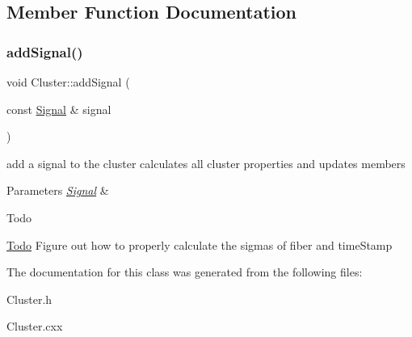 \subsection{Member Function Documentation}
\mbox{\label{classCluster_aa12f4e548b102a48621ca7ec91bc2330}} 
\subsubsection{\texorpdfstring{add\+Signal()}{addSignal()}}
{\footnotesize\ttfamily void Cluster\+::add\+Signal (\begin{DoxyParamCaption}\item[{const \hyperlink{classSignal}{Signal} \&}]{signal }\end{DoxyParamCaption})\hspace{0.3cm}{\ttfamily [inline]}}

add a signal to the cluster calculates all cluster properties and updates members 
\begin{DoxyParams}{Parameters}
{\em \hyperlink{classSignal}{Signal}} & \\
\hline
\end{DoxyParams}
\begin{DoxyRefDesc}{Todo}
\item[\hyperlink{todo__todo000001}{Todo}]Figure out how to properly calculate the sigmas of fiber and time\+Stamp \end{DoxyRefDesc}


The documentation for this class was generated from the following files\+:\begin{DoxyCompactItemize}
\item 
Cluster.\+h\item 
Cluster.\+cxx\end{DoxyCompactItemize}
